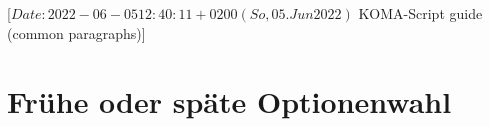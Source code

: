 %
%
%
%
%
%
%

                 [$Date: 2022-06-05 12:40:11 +0200 (So, 05. Jun 2022) $
                  KOMA-Script guide (common paragraphs)]

\section{Frühe oder späte Optionenwahl}
\BeginIndexGroup
{}%

